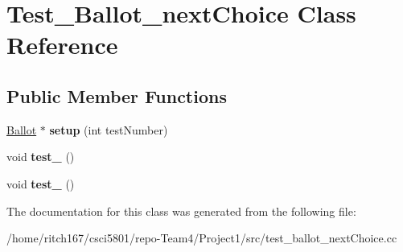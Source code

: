 \hypertarget{classTest__Ballot__nextChoice}{}\section{Test\+\_\+\+Ballot\+\_\+next\+Choice Class Reference}
\label{classTest__Ballot__nextChoice}
\subsection*{Public Member Functions}
\begin{DoxyCompactItemize}
\item 
\mbox{\label{classTest__Ballot__nextChoice_a691f3ee17da797aa30d8c45e1c78da08}} 
\hyperlink{classBallot}{Ballot} $\ast$ {\bfseries setup} (int test\+Number)
\item 
\mbox{\label{classTest__Ballot__nextChoice_a53712b6df704451bdafbcba59ec807cd}} 
void {\bfseries test\+\_} ()
\item 
\mbox{\label{classTest__Ballot__nextChoice_a4a583cfeb227a2692ab4d156140faf96}} 
void {\bfseries test\+\_} ()
\end{DoxyCompactItemize}


The documentation for this class was generated from the following file\+:\begin{DoxyCompactItemize}
\item 
/home/ritch167/csci5801/repo-\/\+Team4/\+Project1/src/test\+\_\+ballot\+\_\+next\+Choice.\+cc\end{DoxyCompactItemize}

